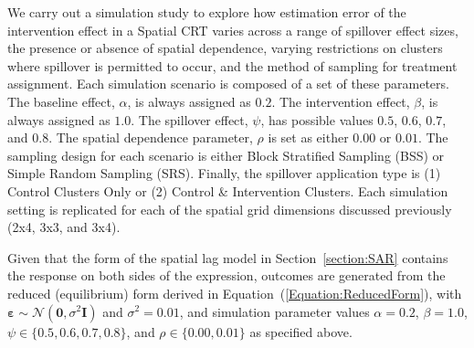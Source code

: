 \documentclass{article}[11pt]
\begin{document}
We carry out a simulation study to explore how estimation error of the intervention effect in a Spatial CRT varies across a range of spillover effect sizes, the presence or absence of spatial dependence, varying restrictions on clusters where spillover is permitted to occur, and the method of sampling for treatment assignment. Each simulation scenario is composed of a set of these parameters. The baseline effect, $\alpha$, is always assigned as $0.2$. The intervention effect, $\beta$, is always assigned as $1.0$. The spillover effect, $\psi$, has possible values $0.5$, $0.6$, $0.7$, and $0.8$. The spatial dependence parameter, $\rho$ is set as either $0.00$ or $0.01$. The sampling design for each scenario is either Block Stratified Sampling (BSS) or Simple Random Sampling (SRS). Finally, the spillover application type is (1) Control Clusters Only or (2) Control \& Intervention Clusters. Each simulation setting is replicated for each of the spatial grid dimensions discussed previously (2x4, 3x3, and 3x4).

Given that the form of the spatial lag model in Section~\ref{section:SAR} contains the response on both sides of the expression, outcomes are generated from the reduced (equilibrium) form derived in Equation~(\ref{Equation:ReducedForm})\cite{fotheringham_sage_2009}\cite{baltagi_spatial_2003}, with $\boldsymbol\varepsilon \sim \mathcal{N}(\mathbf{0}, \sigma^2\mathbf{I})$ and $\sigma^2 = 0.01$, and simulation parameter values $\alpha = 0.2$, $\beta = 1.0$, $\psi \in \{0.5, 0.6, 0.7, 0.8\}$, and $\rho \in \{0.00, 0.01\}$ as specified above.
\end{document}
